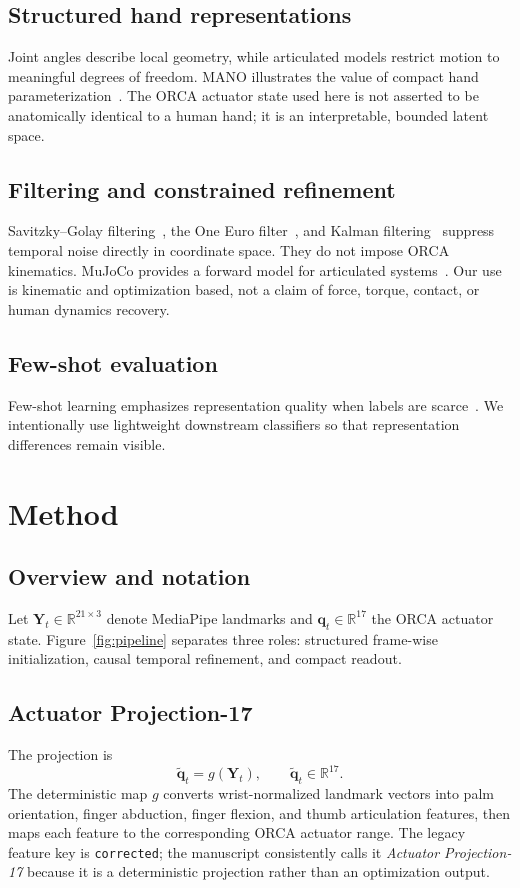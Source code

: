 \documentclass[11pt]{article}
\begin{document}
\subsection{Structured hand representations}
Joint angles describe local geometry, while articulated models restrict motion to meaningful degrees of freedom. MANO illustrates the value of compact hand parameterization~\cite{romero2017embodied}. The ORCA actuator state used here is not asserted to be anatomically identical to a human hand; it is an interpretable, bounded latent space.

\subsection{Filtering and constrained refinement}
Savitzky--Golay filtering~\cite{savitzky1964smoothing}, the One Euro filter~\cite{casiez2012oneeuro}, and Kalman filtering~\cite{kalman1960new} suppress temporal noise directly in coordinate space. They do not impose ORCA kinematics. MuJoCo provides a forward model for articulated systems~\cite{todorov2012mujoco}. Our use is kinematic and optimization based, not a claim of force, torque, contact, or human dynamics recovery.

\subsection{Few-shot evaluation}
Few-shot learning emphasizes representation quality when labels are scarce~\cite{vinyals2016matching,snell2017prototypical}. We intentionally use lightweight downstream classifiers so that representation differences remain visible.

\section{Method}

\subsection{Overview and notation}
Let $\mathbf{Y}_t\in\mathbb{R}^{21\times3}$ denote MediaPipe landmarks and $\mathbf{q}_t\in\mathbb{R}^{17}$ the ORCA actuator state. Figure~\ref{fig:pipeline} separates three roles: structured frame-wise initialization, causal temporal refinement, and compact readout.

\subsection{Actuator Projection-17}
The projection is
\begin{equation}
\tilde{\mathbf q}_t=g(\mathbf Y_t),\qquad \tilde{\mathbf q}_t\in\mathbb R^{17}.
\end{equation}
The deterministic map $g$ converts wrist-normalized landmark vectors into palm orientation, finger abduction, finger flexion, and thumb articulation features, then maps each feature to the corresponding ORCA actuator range. The legacy feature key is \texttt{corrected}; the manuscript consistently calls it \emph{Actuator Projection-17} because it is a deterministic projection rather than an optimization output.
\end{document}
